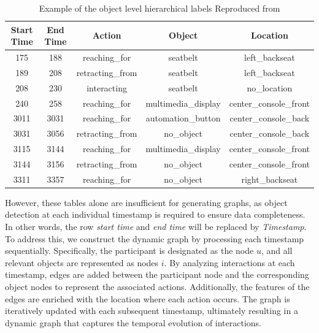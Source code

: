 \begin{table}[h!]
    \centering
    \begin{tabular}{ccccc}
    \toprule
    \textbf{Start Time} & \textbf{End Time} & \textbf{Action}         & \textbf{Object}               & \textbf{Location}           \\ 
    \midrule
    175                 & 188               & reaching\_for           & seatbelt                     & left\_backseat              \\ 
    \midrule
    189                 & 208               & retracting\_from        & seatbelt                     & left\_backseat              \\ 
    \midrule
    208                 & 230               & interacting             & seatbelt                     & no\_location                \\ 
    \midrule
    240                 & 258               & reaching\_for           & multimedia\_display          & center\_console\_front      \\ 
    \midrule
    3011                & 3031              & reaching\_for           & automation\_button           & center\_console\_back       \\ 
    \midrule
    3031                & 3056              & retracting\_from        & no\_object                   & center\_console\_back       \\ 
    \midrule
    3115                & 3144              & reaching\_for           & multimedia\_display          & center\_console\_front      \\ 
    \midrule
    3144                & 3156              & retracting\_from        & no\_object                   & center\_console\_front      \\ 
    \midrule
    3311                & 3357              & reaching\_for           & no\_object                   & right\_backseat             \\ 
    \bottomrule
    \end{tabular}
    \caption{Example of the  object level hierarchical labels Reproduced from\cite{9009583}}
    \label{tab:hierarchical_labels_object}
    \end{table}
    


However, these tables alone are insufficient for generating graphs, as object detection at each individual timestamp is required to ensure data completeness. In other words, the row \textit{start time} and \textit{end time} will be replaced by \textit{Timestamp}. To address this, we construct the dynamic graph by processing each timestamp sequentially. Specifically, the participant is designated as the node $u$, and all relevant objects are represented as nodes $i$. By analyzing interactions at each timestamp, edges are added between the participant node and the corresponding object nodes to represent the associated actions. Additionally, the features of the edges are enriched with the location where each action occurs. The graph is iteratively updated with each subsequent timestamp, ultimately resulting in a dynamic graph that captures the temporal evolution of interactions.
    


